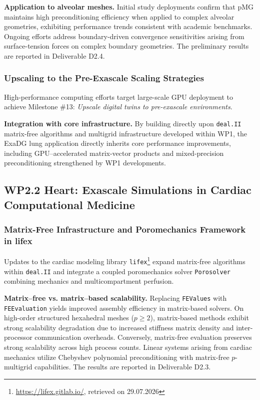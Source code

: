 \documentclass[a4paper,12pt, numbers]{article}
\newcommand{\dealii}{\texttt{deal.II}}
\begin{document}
\noindent\textbf{Application to alveolar meshes.}
Initial study deployments confirm that pMG maintains high preconditioning efficiency when applied to complex alveolar geometries, exhibiting performance trends consistent with academic benchmarks. Ongoing efforts address boundary-driven convergence sensitivities arising from surface-tension forces on complex boundary geometries. The preliminary results are reported in Deliverable D2.4.

\subsubsection*{Upscaling to the Pre-Exascale Scaling Strategies}

\noindent High-performance computing efforts target large-scale GPU deployment to achieve Milestone \#13: \emph{Upscale digital twins to pre-exascale environments}.

\noindent\textbf{Integration with core infrastructure.}
By building directly upon \dealii{} matrix-free algorithms and multigrid infrastructure developed within WP1, the ExaDG lung application directly inherits core performance improvements, including GPU--accelerated matrix-vector products and mixed-precision preconditioning strengthened by WP1 developments.


\subsection{WP2.2 Heart: Exascale Simulations in Cardiac Computational Medicine}
\subsubsection*{Matrix-Free Infrastructure and Poromechanics Framework in lifex}

\noindent Updates to the cardiac modeling library \texttt{lifex}\footnote{\url{https://lifex.gitlab.io/}, retrieved on 29.07.2026} expand matrix-free algorithms within \dealii{} and integrate a coupled poromechanics solver \texttt{Porosolver} combining mechanics and multicompartment perfusion.

\noindent\textbf{Matrix--free vs. matrix--based scalability.}
Replacing \texttt{FEValues} with \texttt{FEEvaluation} yields improved assembly efficiency in matrix-based solvers. On high-order structured hexahedral meshes ($p \ge 2$), matrix-based methods exhibit strong scalability degradation due to increased stiffness matrix density and inter-processor communication overheads. Conversely, matrix-free evaluation preserves strong scalability across high process counts. Linear systems arising from cardiac mechanics utilize Chebyshev polynomial preconditioning with matrix-free $p$-multigrid capabilities. The results are reported in Deliverable D2.3.
\end{document}
